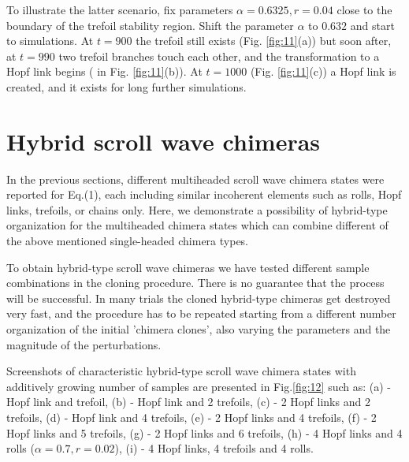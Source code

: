 \documentclass[epjST]{svjour}
\begin{document}
To illustrate the latter scenario, fix parameters $\alpha=0.6325, r=0.04$ close to the boundary of the trefoil stability region.
Shift the parameter $\alpha$ to $0.632$ and start to simulations. At $t=900$ the trefoil still exists (Fig. \ref{fig:11}(a))  but soon after, at $t=990$ two trefoil branches touch each other, and the transformation to a Hopf link begins ( in Fig. \ref{fig:11}(b)).  At  $t=1000$ (Fig. \ref{fig:11}(c)) a Hopf link is created, and it exists for long further simulations.
 

\section{Hybrid scroll wave chimeras}



\hspace*{0.5cm} In the previous sections,  different multiheaded scroll wave chimera states were reported for Eq.(1), each including similar 
incoherent elements such as rolls, Hopf links, trefoils,  or chains only.   Here,  we demonstrate a possibility of  hybrid-type organization for the multiheaded chimera states which can combine different of the above mentioned single-headed chimera types.

To obtain hybrid-type scroll wave chimeras we have tested different sample combinations in the cloning procedure.    There is no guarantee that the process will be successful. In many trials the cloned hybrid-type chimeras get destroyed very fast, and the procedure has to be repeated starting from a different number organization  of the initial 'chimera clones', also  varying the parameters and the magnitude of the perturbations.

Screenshots of characteristic hybrid-type scroll wave  chimera states with additively growing number of samples are presented in Fig.\ref{fig:12} such as:   
(a) - Hopf link and trefoil,  (b) - Hopf link and 2 trefoils,  (c) - 2 Hopf links and 2 trefoils,   (d) -  Hopf link and 4 trefoils,  (e) - 2 Hopf links and 4 trefoils, 
 (f) -  2 Hopf links and 5 trefoils, 
 (g) -  2 Hopf links and 6 trefoils, 
(h) - 4 Hopf links and 4 rolls ($\alpha=0.7, r=0.02$),
(i) - 4 Hopf links, 4 trefoils and 4 rolls. 
\end{document}
